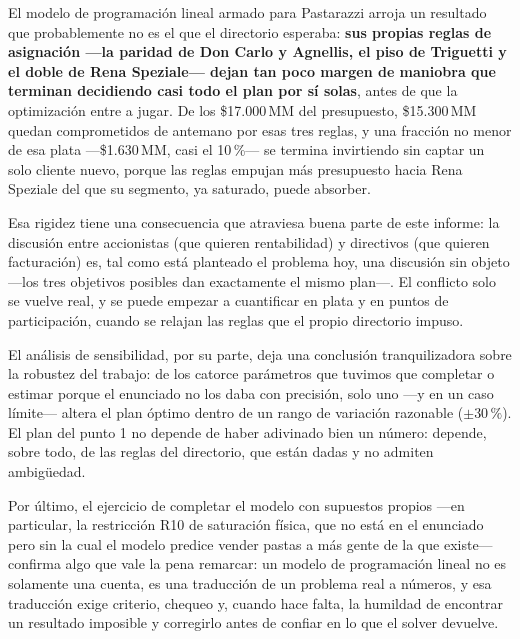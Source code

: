 \documentclass[10pt,a4paper]{article}
\begin{document}
El modelo de programación lineal armado para Pastarazzi arroja un resultado
que probablemente no es el que el directorio esperaba: \textbf{sus propias
reglas de asignación —la paridad de Don Carlo y Agnellis, el piso de
Triguetti y el doble de Rena Speziale— dejan tan poco margen de maniobra que
terminan decidiendo casi todo el plan por sí solas}, antes de que la
optimización entre a jugar. De los \$17.000\,MM del presupuesto, \$15.300\,MM
quedan comprometidos de antemano por esas tres reglas, y una fracción no
menor de esa plata —\$1.630\,MM, casi el 10\,\%— se termina invirtiendo sin
captar un solo cliente nuevo, porque las reglas empujan más presupuesto hacia
Rena Speziale del que su segmento, ya saturado, puede absorber.

Esa rigidez tiene una consecuencia que atraviesa buena parte de este informe:
la discusión entre accionistas (que quieren rentabilidad) y directivos (que
quieren facturación) es, tal como está planteado el problema hoy, una
discusión sin objeto —los tres objetivos posibles dan exactamente el mismo
plan—. El conflicto solo se vuelve real, y se puede empezar a cuantificar en
plata y en puntos de participación, cuando se relajan las reglas que el propio
directorio impuso.

El análisis de sensibilidad, por su parte, deja una conclusión tranquilizadora
sobre la robustez del trabajo: de los catorce parámetros que tuvimos que
completar o estimar porque el enunciado no los daba con precisión, solo uno
—y en un caso límite— altera el plan óptimo dentro de un rango de variación
razonable ($\pm30\,\%$). El plan del punto 1 no depende de haber adivinado
bien un número: depende, sobre todo, de las reglas del directorio, que están
dadas y no admiten ambigüedad.

Por último, el ejercicio de completar el modelo con supuestos propios —en
particular, la restricción R10 de saturación física, que no está en el
enunciado pero sin la cual el modelo predice vender pastas a más gente de la
que existe— confirma algo que vale la pena remarcar: un modelo de
programación lineal no es solamente una cuenta, es una traducción de un
problema real a números, y esa traducción exige criterio, chequeo y, cuando
hace falta, la humildad de encontrar un resultado imposible y corregirlo antes
de confiar en lo que el solver devuelve.

\renewcommand{\refname}{Bibliografía}
\end{document}
